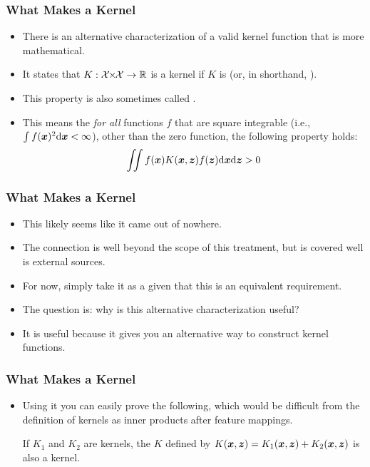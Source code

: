 \documentclass[trans]{beamer}
\begin{document}
\begin{frame}
  \frametitle{What Makes a Kernel}
\begin{itemize}
\item 
There is an alternative characterization of a valid kernel function
that is more mathematical.
\item  It states that $K : \cX \times \cX \fto
\R$ is a kernel if $K$ is  (or, in
shorthand, ). 
\item This property is also sometimes called
.  
\item This means the
\emph{for all} functions $f$ that are square integrable (i.e., $\int
f({\boldsymbol{x}})^2 \textrm{d}{\boldsymbol{x}} < \infty$), other than the zero function, the
following property holds:
%
\begin{align}
\int\!\!\!\int f({\boldsymbol{x}}) K({\boldsymbol{x}},{\boldsymbol{z}}) f({\boldsymbol{z}}) \textrm{d} {\boldsymbol{x}} \textrm{d} {\boldsymbol{z}} > 0
\end{align}
%
\end{itemize}
\end{frame}

\begin{frame}
  \frametitle{What Makes a Kernel}
\begin{itemize}
\item 
This likely seems like it came out of nowhere. 
\item The
connection is well beyond the scope of this treatment, but is covered well
is external sources.
\item  For now, simply take it as a given that this is
an equivalent requirement.
%
\item 
The question is: why is this alternative characterization useful? 
\item It
is useful because it gives you an alternative way to construct kernel
functions.
\end{itemize}
\end{frame}

\begin{frame}
  \frametitle{What Makes a Kernel}
\begin{itemize}
\item Using it you can easily prove the following,
which would be difficult from the definition of kernels as inner
products after feature mappings.
%
\begin{theorem} \label{thm:kernel:addition}
  If $K_1$ and $K_2$ are kernels, the $K$ defined by $K({\boldsymbol{x}},{\boldsymbol{z}}) =
  K_1({\boldsymbol{x}},{\boldsymbol{z}}) + K_2({\boldsymbol{x}},{\boldsymbol{z}})$ is also a kernel.
\end{theorem}
\end{itemize}
\end{frame}
\end{document}
